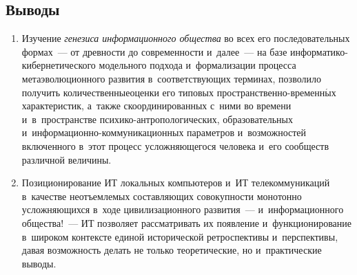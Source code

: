 \begin{multicols}{2}
\vspace*{-10pt}
  
  \section*{Выводы}
  
  \vspace*{-2pt}
  
  \noindent
  \begin{enumerate}[1.]
\item  Изучение \textit{генезиса информационного общества} во всех его 
последовательных формах~--- от древности до современности и~далее~--- на 
базе\linebreak
 ин\-фор\-ма\-ти\-ко-ки\-бер\-не\-ти\-че\-ско\-го модельного подхода 
и~формализации процесса метаэволю\-ционного развития в~соответствующих 
терминах, позволило получить количественные\linebreak оценки его типовых  
про\-стран\-ст\-вен\-но-вре\-менн$\acute{\mbox{ы}}$х характеристик, 
а~также скоординированных с~ними во времени и~в~пространстве  
психико-ант\-ро\-по\-ло\-ги\-че\-ских, образовательных %
и~ин\-фор\-ма\-ци\-он\-но-ком\-му\-ни\-ка\-ци\-он\-ных параметров 
и~возможностей включенного в~этот процесс усложняющегося человека 
и~его сообществ различной величины.
  \item  Позиционирование ИТ локальных компьютеров и~ИТ 
телекоммуникаций в~качестве неотъемлемых составляющих совокупности\linebreak 
монотонно усложняющихся в~ходе цивилизационного развития~--- 
и~информационного общества!~--- ИТ позволяет 
рассматривать их появление и~функционирование в~широком контексте 
единой исторической ретроспективы и~перспективы, давая возможность 
делать не только теоретические, но и~практические выводы.
  \end{enumerate}
  

\end{multicols}

